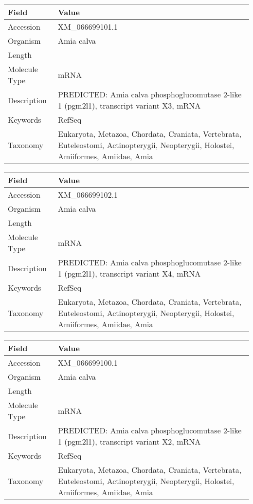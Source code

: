 \documentclass[10pt]{article}
\begin{document}
{\footnotesize
\begin{longtable}{>{\raggedright\arraybackslash}p{4.5cm} >{\raggedright\arraybackslash}p{11.5cm}}
\textbf{Field} & \textbf{Value} \\
\hline
Accession & XM\_066699101.1 \\
Organism & Amia calva \\
Length & 7155 \\
Molecule Type & mRNA \\
Description & PREDICTED: Amia calva phosphoglucomutase 2-like 1 (pgm2l1), transcript variant X3, mRNA \\
Keywords & RefSeq \\
Taxonomy & Eukaryota, Metazoa, Chordata, Craniata, Vertebrata, Euteleostomi, Actinopterygii, Neopterygii, Holostei, Amiiformes, Amiidae, Amia \\
\end{longtable}
}

{\footnotesize
\begin{longtable}{>{\raggedright\arraybackslash}p{4.5cm} >{\raggedright\arraybackslash}p{11.5cm}}
\textbf{Field} & \textbf{Value} \\
\hline
Accession & XM\_066699102.1 \\
Organism & Amia calva \\
Length & 6802 \\
Molecule Type & mRNA \\
Description & PREDICTED: Amia calva phosphoglucomutase 2-like 1 (pgm2l1), transcript variant X4, mRNA \\
Keywords & RefSeq \\
Taxonomy & Eukaryota, Metazoa, Chordata, Craniata, Vertebrata, Euteleostomi, Actinopterygii, Neopterygii, Holostei, Amiiformes, Amiidae, Amia \\
\end{longtable}
}

{\footnotesize
\begin{longtable}{>{\raggedright\arraybackslash}p{4.5cm} >{\raggedright\arraybackslash}p{11.5cm}}
\textbf{Field} & \textbf{Value} \\
\hline
Accession & XM\_066699100.1 \\
Organism & Amia calva \\
Length & 6817 \\
Molecule Type & mRNA \\
Description & PREDICTED: Amia calva phosphoglucomutase 2-like 1 (pgm2l1), transcript variant X2, mRNA \\
Keywords & RefSeq \\
Taxonomy & Eukaryota, Metazoa, Chordata, Craniata, Vertebrata, Euteleostomi, Actinopterygii, Neopterygii, Holostei, Amiiformes, Amiidae, Amia \\
\end{longtable}
}
\end{document}
